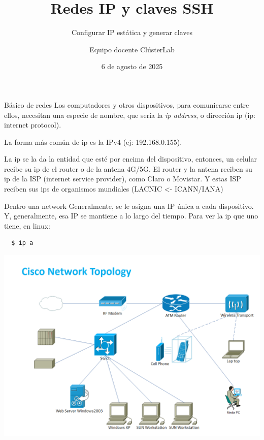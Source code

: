 \documentclass[aspectratio=169,professionalfonts]{beamer}
\title[ClústerLab • Día 2]{Redes IP y claves SSH}
\subtitle{Configurar IP estática y generar claves}
\author{Equipo docente ClústerLab}
\date{6 de agosto de 2025}
\begin{document}
\begin{frame}[plain]
  \titlepage
\end{frame}

\begin{frame}[fragile]{Básico de redes}
  Los computadores y otros dispositivos, para comunicarse entre ellos, necesitan una especie de nombre,
  que sería la \textit{ip address}, o dirección ip (ip: internet protocol).

  La forma más común de ip es la IPv4 (ej: 192.168.0.155).

  La ip se la da la entidad que esté por encima del dispositivo, entonces, un celular recibe su ip de 
  el router o de la antena 4G/5G. El router y la antena reciben su ip de la ISP (internet service provider),
  como Claro o Movistar. Y estas ISP reciben sus ips de organismos mundiales (LACNIC <- ICANN/IANA)
\end{frame}

\begin{frame}[fragile]{Dentro una network}
  Generalmente, se le asigna una IP única a cada dispositivo. Y, generalmente, esa IP se mantiene a lo largo del tiempo.
  Para ver la ip que uno tiene, en linux:
  \begin{verbatim}
  $ ip a
  \end{verbatim}
  \begin{center}
    \includegraphics[width=.45\textwidth]{cisco_network_diagram.png}
  \end{center}
\end{frame}
\end{document}
